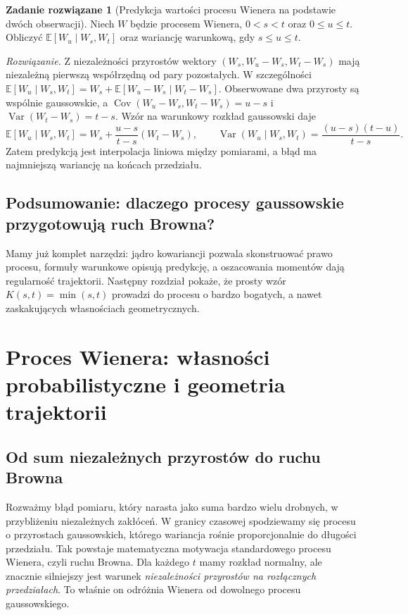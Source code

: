\documentclass[11pt,a4paper,oneside]{report}
\numberwithin{equation}{chapter}
\theoremstyle{plain}
\theoremstyle{definition}
\newtheorem{zadanie}{Zadanie rozwiązane}[chapter]
\theoremstyle{remark}
\newcommand{\E}{\mathbb{E}}
\newcommand{\Var}{\operatorname{Var}}
\newcommand{\Cov}{\operatorname{Cov}}
\begin{document}
\begin{zadanie}[Predykcja wartości procesu Wienera na podstawie dwóch obserwacji]
Niech $W$ będzie procesem Wienera, $0<s<t$ oraz $0\le u\le t$.
Obliczyć $\E[W_u\mid W_s,W_t]$ oraz wariancję warunkową,
gdy $s\le u\le t$.

\emph{Rozwiązanie.} Z niezależności przyrostów wektory
$(W_s,W_u-W_s,W_t-W_s)$ mają niezależną pierwszą współrzędną
od pary pozostałych. W szczególności
$\E[W_u\mid W_s,W_t]=W_s+\E[W_u-W_s\mid W_t-W_s]$.
Obserwowane dwa przyrosty są wspólnie gaussowskie,
a $\Cov(W_u-W_s,W_t-W_s)=u-s$ i
$\Var(W_t-W_s)=t-s$.
Wzór na warunkowy rozkład gaussowski daje
\[
\E[W_u\mid W_s,W_t]
=W_s+\frac{u-s}{t-s}(W_t-W_s),\qquad
\Var(W_u\mid W_s,W_t)=\frac{(u-s)(t-u)}{t-s}.
\]
Zatem predykcją jest interpolacja liniowa między pomiarami,
a błąd ma najmniejszą wariancję na końcach przedziału.
\end{zadanie}

\section{Podsumowanie: dlaczego procesy gaussowskie przygotowują ruch Browna?}
Mamy już komplet narzędzi: jądro kowariancji pozwala skonstruować
prawo procesu, formuły warunkowe opisują predykcję, a
oszacowania momentów dają regularność trajektorii.
Następny rozdział pokaże, że prosty wzór $K(s,t)=\min(s,t)$
prowadzi do procesu o bardzo bogatych, a nawet zaskakujących
własnościach geometrycznych.

\chapter{Proces Wienera: własności probabilistyczne i geometria trajektorii}
\label{ch:wiener}

\section{Od sum niezależnych przyrostów do ruchu Browna}
Rozważmy błąd pomiaru, który narasta jako suma bardzo wielu drobnych,
w przybliżeniu niezależnych zakłóceń. W granicy czasowej spodziewamy
się procesu o przyrostach gaussowskich, którego wariancja rośnie
proporcjonalnie do długości przedziału. Tak powstaje matematyczna
motywacja standardowego procesu Wienera, czyli ruchu Browna.
Dla każdego $t$ mamy rozkład normalny, ale znacznie silniejszy
jest warunek \emph{niezależności przyrostów na rozłącznych
przedziałach}. To właśnie on odróżnia Wienera od dowolnego
procesu gaussowskiego.
\end{document}
